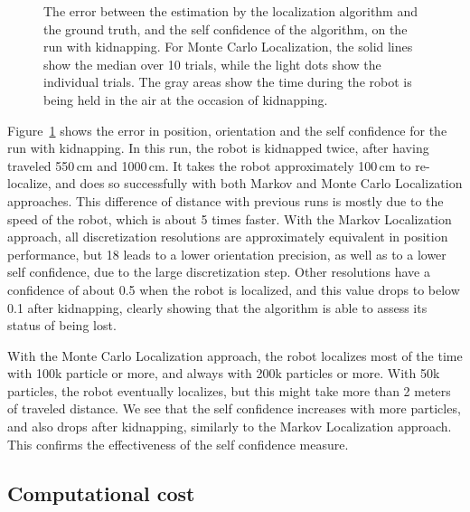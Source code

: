 \documentclass[letterpaper, 10pt, conference]{ieeeconf}
\newcommand{\Fig}[1]{Figure~\ref{fig:#1}}
\begin{document}
\begin{figure}
\caption{The error between the estimation by the localization algorithm and the ground truth, and the self confidence of the algorithm, on the run with kidnapping.
For Monte Carlo Localization, the solid lines show the median over 10 trials, while the light dots show the individual trials.
The gray areas show the time during the robot is being held in the air at the occasion of kidnapping.}
\label{fig:whole-runs-random-long}
\end{figure}

\Fig{whole-runs-random-long} shows the error in position, orientation and the self confidence for the run with kidnapping.
In this run, the robot is kidnapped twice, after having traveled 550\,cm and 1000\,cm.
It takes the robot approximately 100\,cm to re-localize, and does so successfully with both Markov and Monte Carlo Localization approaches.
This difference of distance with previous runs is mostly due to the speed of the robot, which is about 5 times faster.
With the Markov Localization approach, all discretization resolutions are approximately equivalent in position performance, but 18 leads to a lower orientation precision, as well as to a lower self confidence, due to the large discretization step.
Other resolutions have a confidence of about 0.5 when the robot is localized, and this value drops to below 0.1 after kidnapping, clearly showing that the algorithm is able to assess its status of being lost.

With the Monte Carlo Localization approach, the robot localizes most of the time with 100k particle or more, and always with 200k particles or more.
With 50k particles, the robot eventually localizes, but this might take more than 2 meters of traveled distance.
We see that the self confidence increases with more particles, and also drops after kidnapping, similarly to the Markov Localization approach.
This confirms the effectiveness of the self confidence measure.

\subsection{Computational cost}

\end{document}
